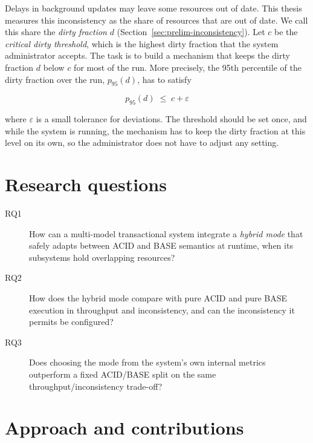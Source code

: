 Delays in background updates may leave some resources out of date. This thesis
measures this inconsistency as the share of resources that are out of date. We
call this share the \emph{dirty fraction} $d$
(Section~\ref{sec:prelim-inconsistency}). Let $c$ be the \emph{critical dirty
  threshold}, which is the highest dirty fraction
that the system administrator accepts. The task is to build a mechanism that
keeps the dirty fraction $d$
below $c$ for most of the run. More precisely, the 95th percentile of the dirty
fraction over the run, $p_{95}(d)$, has to satisfy

\begin{equation}
  p_{95}(d) \;\le\; c + \varepsilon
  \label{eq:problem}
\end{equation}

where $\varepsilon$ is a small tolerance for deviations. The threshold should be
set once, and while the system is running, the mechanism has to keep the dirty
fraction at this level on its own, so the administrator does not have to adjust
any setting.

\section{Research questions}\label{sec:intro-rqs}

\begin{description}
  \item[RQ1] How can a multi-model transactional system integrate a \emph{hybrid
          mode} that safely adapts between ACID and BASE semantics at runtime,
        when its subsystems hold overlapping resources?

  \item[RQ2] How does the hybrid mode compare with pure ACID and pure BASE
        execution in throughput and inconsistency, and can the inconsistency it
        permits be configured?

  \item[RQ3] Does choosing the mode from the system's own internal metrics
        outperform a fixed ACID/BASE split on the same throughput/inconsistency
        trade-off?
\end{description}

\section{Approach and
  contributions}\label{sec:intro-contributions}\label{sec:intro-approach-overview}

